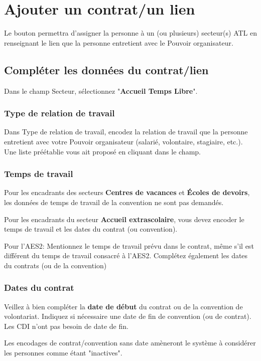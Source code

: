 \section{Ajouter un contrat/un lien}\label{team_add_contract}
Le bouton  permettra d'assigner la personne à un (ou plusieurs) secteur(s) ATL en renseignant le lien que la personne entretient avec le Pouvoir organisateur.


\subsection{Compléter les données du contrat/lien}
Dans le champ Secteur, sélectionnez "\textbf{Accueil Temps Libre}". 


\subsubsection{Type de relation de travail}
Dans Type de relation de travail, encodez la relation de travail que la personne entretient avec votre Pouvoir organisateur (salarié, volontaire, stagiaire, etc.). Une liste préétablie vous ait proposé en cliquant dans le champ. 

\subsubsection{Temps de travail}
Pour les encadrants des secteurs \textbf{Centres de vacances} et \textbf{Écoles de devoirs}, les données de temps de travail de la convention ne sont pas demandés.


Pour les encadrants du secteur \textbf{Accueil extrascolaire}, vous devez encoder le temps de travail et les dates du contrat (ou convention). 


Pour l'AES2: Mentionnez le temps de travail prévu dans le contrat, même s’il est différent du temps de travail consacré à l’AES2. Complétez également les dates du contrats (ou de la convention)

\subsubsection{Dates du contrat}
Veillez à bien compléter la \textcolor{rouge}{\textbf{date de début}} du contrat ou de la convention de volontariat. Indiquez si nécessaire une date de fin de convention (ou de contrat). Les CDI n'ont pas besoin de date de fin.



\begin{remarque}
 Les encodages de contrat/convention sans date amèneront le système à  considérer les personnes comme étant "inactives". 
\end{remarque}

